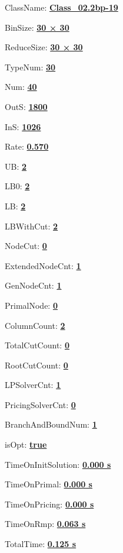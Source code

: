 \documentclass[11pt]{article}
\begin{document}
\pagestyle{empty}


ClassName: \underline{\textbf{Class_02.2bp-19}}
\par
BinSize: \underline{\textbf{30 × 30}}
\par
ReduceSize: \underline{\textbf{30 × 30}}
\par
TypeNum: \underline{\textbf{30}}
\par
Num: \underline{\textbf{40}}
\par
OutS: \underline{\textbf{1800}}
\par
InS: \underline{\textbf{1026}}
\par
Rate: \underline{\textbf{0.570}}
\par
UB: \underline{\textbf{2}}
\par
LB0: \underline{\textbf{2}}
\par
LB: \underline{\textbf{2}}
\par
LBWithCut: \underline{\textbf{2}}
\par
NodeCut: \underline{\textbf{0}}
\par
ExtendedNodeCnt: \underline{\textbf{1}}
\par
GenNodeCnt: \underline{\textbf{1}}
\par
PrimalNode: \underline{\textbf{0}}
\par
ColumnCount: \underline{\textbf{2}}
\par
TotalCutCount: \underline{\textbf{0}}
\par
RootCutCount: \underline{\textbf{0}}
\par
LPSolverCnt: \underline{\textbf{1}}
\par
PricingSolverCnt: \underline{\textbf{0}}
\par
BranchAndBoundNum: \underline{\textbf{1}}
\par
isOpt: \underline{\textbf{true}}
\par
TimeOnInitSolution: \underline{\textbf{0.000 s}}
\par
TimeOnPrimal: \underline{\textbf{0.000 s}}
\par
TimeOnPricing: \underline{\textbf{0.000 s}}
\par
TimeOnRmp: \underline{\textbf{0.063 s}}
\par
TotalTime: \underline{\textbf{0.125 s}}
\par
\newpage
\end{document}
